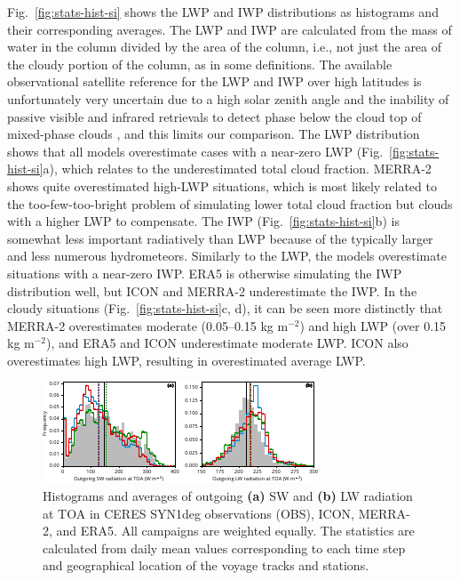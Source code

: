 \documentclass[draft]{agujournal2019}
\begin{document}
Fig.~\ref{fig:stats-hist-si} shows the LWP and IWP distributions as histograms and their corresponding averages. The LWP and IWP are calculated from the mass of water in the column divided by the area of the column, i.e., not just the area of the cloudy portion of the column, as in some definitions. The available observational satellite reference for the LWP and IWP over high latitudes is unfortunately very uncertain due to a high solar zenith angle and the inability of passive visible and infrared retrievals to detect phase below the cloud top of mixed-phase clouds \cite{huang2006,greenwald2009,seethala2010,eliasson2011,duncan2018,khanal2020}, and this limits our comparison. The LWP distribution shows that all models overestimate cases with a near-zero LWP (Fig.~\ref{fig:stats-hist-si}a), which relates to the underestimated total cloud fraction. MERRA-2 shows quite overestimated high-LWP situations, which is most likely related to the too-few-too-bright problem of simulating lower total cloud fraction but clouds with a higher LWP to compensate. The IWP (Fig.~\ref{fig:stats-hist-si}b) is somewhat less important radiatively than LWP because of the typically larger and less numerous hydrometeors. Similarly to the LWP, the models overestimate situations with a near-zero IWP. ERA5 is otherwise simulating the IWP distribution well, but ICON and MERRA-2 underestimate the IWP. In the cloudy situations (Fig.~\ref{fig:stats-hist-si}c, d), it can be seen more distinctly that MERRA-2 overestimates moderate (0.05–0.15 kg m$^{-2}$) and high LWP (over 0.15 kg m$^{-2}$), and ERA5 and ICON underestimate moderate LWP. ICON also overestimates high LWP, resulting in overestimated average LWP.

\begin{figure}[t]
\centering
\includegraphics[width=\textwidth]{img/stats_hist_rad.pdf}
\caption{
Histograms and averages of outgoing \textbf{(a)} SW and \textbf{(b)} LW radiation at TOA in CERES SYN1deg observations (OBS), ICON, MERRA-2, and ERA5. All campaigns are weighted equally. The statistics are calculated from daily mean values corresponding to each time step and geographical location of the voyage tracks and stations.
}
\label{fig:stats-hist-rad}
\end{figure}
\end{document}
